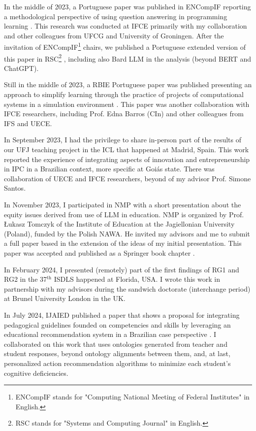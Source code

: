 In the middle of 2023, a Portuguese paper was published in \gls{ENCompIF} reporting a methodological perspective of using question answering in programming learning \cite{freire:2023-encompif}. This research was conducted at \gls{IFCE} primarily with my collaboration and other colleagues from \gls{UFCG} and University of Groningen. After the invitation of \gls{ENCompIF}\footnote{ENCompIF stands for "Computing National Meeting of Federal Institutes" in English.} chairs, we published a Portuguese extended version of this paper in \gls{RSC}\footnote{RSC stands for "Systems and Computing Journal" in English.} \cite{freire:2023-rsc}, including also Bard \gls{LLM} in the analysis (beyond \gls{BERT} and ChatGPT).

Still in the middle of 2023, a \gls{RBIE} Portuguese paper was published presenting an approach to simplify learning through the practice of projects of computational systems in a simulation environment \cite{esmeraldo:2023}. This paper was another collaboration with \gls{IFCE} researchers, including Prof. Edna Barros (\gls{CIn}) and other colleagues from \gls{IFS} and \gls{UECE}.

In September 2023, I had the privilege to share in-person part of the results of our \gls{UFJ} teaching project \cite{boaventura:2023} in the \gls{ICL} that happened at Madrid, Spain. This work reported the experience of integrating aspects of innovation and entrepreneurship in \gls{IPC} in a Brazilian context, more specific at Goiás state. There was collaboration of \gls{UECE} and \gls{IFCE} researchers, beyond of my advisor Prof. Simone Santos.

In November 2023, I participated in \gls{NMP} with a short presentation about the equity issues derived from use of \gls{LLM} in education. \gls{NMP} is organized by Prof. Łukasz Tomczyk of the Institute of Education at the Jagiellonian University (Poland), funded by the Polish \gls{NAWA}. He invited my advisors and me to submit a full paper based in the extension of the ideas of my initial presentation. This paper was accepted and published as a Springer book chapter \cite{bispojr:2024-nmp}.

In February 2024, I presented (remotely) part of the first findings of \gls{RG}1 and \gls{RG}2 \cite{bispojr:2024-isdls} in the 37$^{\mbox{th}}$ \gls{ISDLS} happened at Florida, \gls{USA}. I wrote this work in partnership with my advisors during the sandwich doctorate (interchange period) at Brunel University London in the \gls{UK}.

In July 2024, \gls{IJAIED} published a paper that shows a proposal for integrating pedagogical guidelines founded on competencies and skills by leveraging an educational recommendation system in a Brazilian case perspective \cite{feitosa:2024}. I collaborated on this work that uses ontologies generated from teacher and student responses, beyond ontology alignments between them, and, at last, personalized action recommendation algorithms to minimize each student’s cognitive deficiencies.

